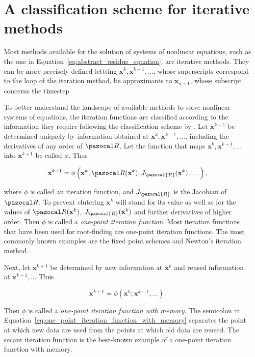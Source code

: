 \section{A classification scheme for iterative methods}

Most methods available for the solution of systems of nonlinear equations, such as the one in Equation~\eqref{eq:abstract_residue_equation}, are iterative methods.
They can be more precisely defined lettting \(\mathbf x^{k},\mathbf x^{k-1}, \ldots\), whose superscripts correspond to the loop of the iteration method, be approximants to \(\mathbf x_{n+1}\), whose subscript concerns the timestep

To better understand the landscape of available methods to solve nonlinear systems of equations, the iteration functions are classified according to the information they require following the classification scheme by \cite{traub_iterative_1982}.
Let \(\mathbf x^{k+1}\) be determined uniquely by information obtained at \(\mathbf x^{k}, \mathbf x^{k-1}, \ldots\), including the derivatives of any order of \(\pazocal R\).
Let the function that maps \(\mathbf x^{k}, \mathbf x^{k-1}, \ldots\) into \(\mathbf x^{k+1}\) be called \(\phi\).
Thus
\begin{highlight}
\begin{equation}
  \mathbf x^{k+1}=\phi\left(\mathbf x^{k},\pazocal R(\mathbf x^{k}), J_\pazocal{R}(\mathbf x^k), \dots\right),
\end{equation}
\end{highlight}
where \(\phi\) is called an iteration function, and \(J_\pazocal{R}\) is the Jacobian of \(\pazocal R\).
To prevent clutering \(\mathbf x^k\) will stand for its value as well as for the values of \(\pazocal R(\mathbf x^k)\), \(J_\pazocal{R}(\mathbf x^k)\) and further derivatives of higher order.
Then \(\phi\) is called a \textit{one-point iteration function}.
Most iteration functions that have been used for root-finding are one-point iteration functions. The most commonly known examples are the fixed point schemes and Newton's iteration method.

Next, let \(\mathbf x^{k+1}\) be determined by new information at \(\mathbf x^{k}\) and reused information at \(\mathbf x^{k-1}, \ldots\)
Thus
\begin{highlight}
  \begin{equation}\label{eq:one_point_iteration_function_with_memory}
    \mathbf x^{k+1}=\phi\left(\mathbf x^{k} ; \mathbf x^{k-1}, \ldots\right) .
  \end{equation}
\end{highlight}
Then \(\phi\) is called a \textit{one-point iteration function with memory}.
The semicolon in Equation~\eqref{eq:one_point_iteration_function_with_memory} separates the point at which new data are used from the points at which old data are reused.
The secant iteration function is the best-known example of a one-point iteration function with memory.

